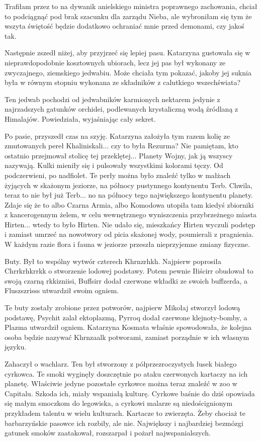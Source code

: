 \ds{} Trafiłam przez to na dywanik anielskiego ministra poprawnego zachowania, chciał to podciągnąć pod brak szacunku dla zarządu Nieba, ale wybroniłam się tym że wszyta świętość
będzie dodatkowo ochraniać mnie przed demonami, czy jakoś tak. \de{}

Następnie zszedł niżej, aby przyjrzeć się lepiej pasu.
Katarzyna gustowała się w nieprawdopodobnie kosztownych ubiorach, lecz jej pas był wykonany ze zwyczajnego, ziemskiego jedwabiu.
Może chciała tym pokazać, jakoby jej suknia była w równym stopniu wykonana ze składników z calutkiego wszechświata?

\ds{} Ten jedwab pochodzi od jedwabników karmionych nektarem jedynie z najrzadszych gatunków orchidei, podlewanych krystaliczną wodą źródlaną z Himalajów. 
\dm{} Powiedziała, wyjaśniając cały sekret. \de{}

Po pasie, przyszedł czas na szyję. Katarzyna założyła tym razem kolię ze zmutowanych pereł Khaliniskali...
czy to była Rezurma? Nie pamiętam, kto ostatnio przejmował stolicę tej przeklętej... Planety Wojny, jak ją wszyscy nazywają.
Kulki mieniły się i pulsowały wszystkimi kolorami tęczy. Od podczerwieni, po nadfiolet.
Te perły można było znaleźć tylko w małżach żyjących w skażonym jeziorze, na północy pustynnego kontynentu Terb. Chwila, teraz to nie był już Terb... no na północy tego największego kontynentu planety.
Zdaje się że to albo Czarna Armia, albo Komodowa utopiła tam kiedyś zbiorniki z kancerogennym żelem, w celu wewnętrznego wyniszczenia przybrzeżnego miasta Hirten... wtedy to było Hirten.
Nie udało się, mieszkańcy Hirten wyczuli podstęp i zamiast umrzeć na nowotwory od picia skażonej wody, poumierali z pragnienia.
W każdym razie flora i fauna w jeziorze przeszła nieprzyjemne zmiany fizyczne.

Buty. Był to wspólny wytwór czterech Khrnzrhkh.
Najpierw poprosiła Chrrkrhkrrkk o stworzenie lodowej podstawy.
Potem pewnie Iłiścirr obudował to swoją czarną rkkizniisi, Buffsirr dodał czerwone wkładki ze swoich buffzerda, a Fluszszrisss utwardził swoim ogniem.

\ds{} Te buty zostały zrobione przez potworów, najpierw Mikołaj stworzył lodową podstawę, Psychit zalał ektoplazmą, Pyrroq dodał czerwone klejnoty-bomby, a Plazma utwardził ogniem. \dm{}
Katarzyna Kosmata właśnie spowodowała, że kolejna osoba będzie nazywać Khrnzaalk potworami, zamiast porządnie w ich własnym języku. \de{}

Zahaczył o wachlarz.
Ten był stworzony z półprzezroczystych łusek białego cyrkowca.
Te smoki wyginęły doszczętnie po ataku czerwonych kartaczy na ich planetę.
Właściwie jedyne pozostałe cyrkowce można teraz znaleźć w zoo w Capitalu.
Szkoda ich, miały wspaniałą kulturę.
Cyrkowe baśnie do dziś opowiada się małym smoczkom do legowiska, a cyrkowi malarze są niedoścignionym przykładem talentu w wielu kulturach.
Kartacze to zwierzęta. Żeby chociaż te barbarzyńskie pasowce ich rozbiły, ale nie. Największy i najbardziej bezmózgi gatunek smoków zaatakował, rozszarpał i pożarł najwspanialszych.

